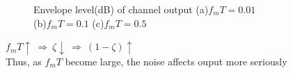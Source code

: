 \documentclass{article}
\begin{document}
\begin{flushleft}
\begin{enumerate}
\newpage
\begin{figure}[H]
\centering
{}
\caption{Envelope level(dB) of channel output (a)$f_mT=0.01$ \\(b)$f_mT=0.1$ (c)$f_mT=0.5$}
\end{figure}
$f_mT \uparrow\ \Rightarrow\ \zeta \downarrow\ \Rightarrow\ (1-\zeta)\uparrow $\\
Thus, as $f_mT$ become large, the noise affects ouput more seriously


\end{enumerate}
\end{flushleft}
\end{document}
